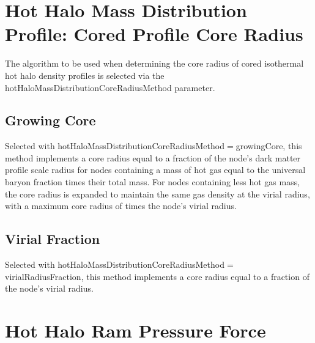 \section{Hot Halo Mass Distribution Profile: Cored Profile Core Radius}\label{sec:hotHaloDensityProfileCoredIsothermalCoreRadius}

The algorithm to be used when determining the core radius of cored isothermal hot halo density profiles is selected via the {\normalfont \ttfamily hotHaloMassDistributionCoreRadiusMethod} parameter.

\subsection{Growing Core}\label{phys:hotHaloMassDistributionCoreRadius:hotHaloMassDistributionCoreRadiusGrowing}

Selected with {\normalfont \ttfamily hotHaloMassDistributionCoreRadiusMethod}$=${\normalfont \ttfamily growingCore}, this method implements a core radius equal to a fraction {\normalfont \ttfamily [coreRadiusOverScaleRadius]} of the node's dark matter profile scale radius for nodes containing a mass of hot gas equal to the universal baryon fraction times their total mass. For nodes containing less hot gas mass, the core radius is expanded to maintain the same gas density at the virial radius, with a maximum core radius of {\normalfont \ttfamily [coreRadiusOverVirialRadiusMaximum]} times the node's virial radius.

\subsection{Virial Fraction}\label{phys:hotHaloMassDistributionCoreRadius:hotHaloMassDistributionCoreRadiusVirialFraction}

Selected with {\normalfont \ttfamily hotHaloMassDistributionCoreRadiusMethod}$=${\normalfont \ttfamily virialRadiusFraction}, this method implements a core radius equal to a fraction {\normalfont \ttfamily [coreRadiusOverVirialRadius]} of the node's virial radius.

\section{Hot Halo Ram Pressure Force}\label{sec:HotHaloRamPressureForce}

